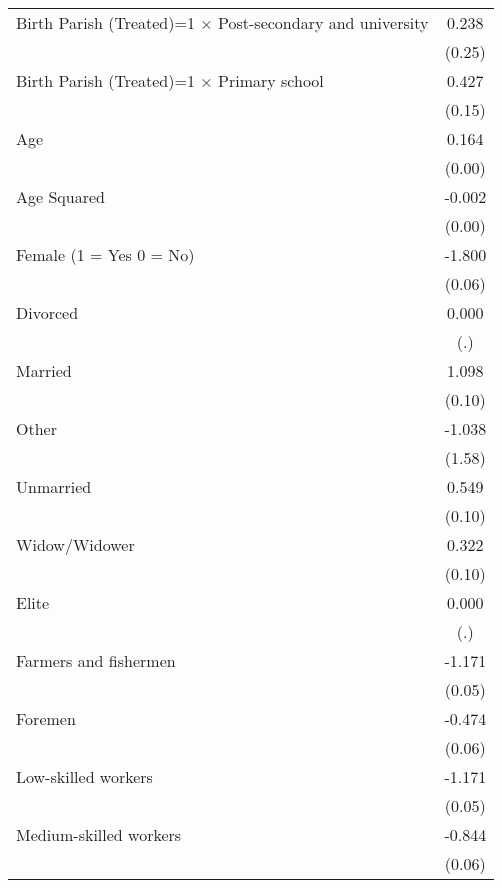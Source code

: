 {\begin{tabular}{l*{1}{c}}
Birth Parish (Treated)=1 $\times$ Post-secondary and university&       0.238         \\
                    &      (0.25)         \\
Birth Parish (Treated)=1 $\times$ Primary school&       0.427\sym{**} \\
                    &      (0.15)         \\
Age                 &       0.164\sym{***}\\
                    &      (0.00)         \\
Age Squared         &      -0.002\sym{***}\\
                    &      (0.00)         \\
Female (1 = Yes 0 = No)&      -1.800\sym{***}\\
                    &      (0.06)         \\
Divorced            &       0.000         \\
                    &         (.)         \\
Married             &       1.098\sym{***}\\
                    &      (0.10)         \\
Other               &      -1.038         \\
                    &      (1.58)         \\
Unmarried           &       0.549\sym{***}\\
                    &      (0.10)         \\
Widow/Widower       &       0.322\sym{***}\\
                    &      (0.10)         \\
Elite               &       0.000         \\
                    &         (.)         \\
Farmers and fishermen&      -1.171\sym{***}\\
                    &      (0.05)         \\
Foremen             &      -0.474\sym{***}\\
                    &      (0.06)         \\
Low-skilled workers &      -1.171\sym{***}\\
                    &      (0.05)         \\
Medium-skilled workers&      -0.844\sym{***}\\
                    &      (0.06)         \\

\end{tabular}}
